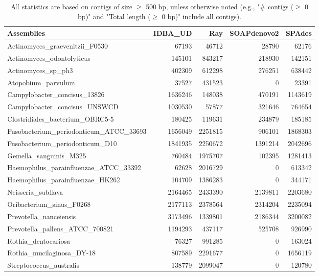 \documentclass[12pt,a4paper]{article}
\begin{document}
\begin{table}[ht]
\begin{center}
\caption{All statistics are based on contigs of size $\geq$ 500 bp, unless otherwise noted (e.g., "\# contigs ($\geq$ 0 bp)" and "Total length ($\geq$ 0 bp)" include all contigs).}
\begin{tabular}{|l*{4}{|r}|}
\hline
Assemblies & IDBA\_UD & Ray & SOAPdenovo2 & SPAdes \\ \hline
Actinomyces\_graevenitzii\_F0530 & 67193 & 46712 & 28790 & 62176 \\ \hline
Actinomyces\_odontolyticus & 145101 & 843217 & 218930 & 142151 \\ \hline
Actinomyces\_sp\_ph3 & 402309 & 612298 & 276251 & 638442 \\ \hline
Atopobium\_parvulum & 37527 & 431523 & 0 & 23391 \\ \hline
Campylobacter\_concisus\_13826 & 1636246 & 148038 & 470191 & 1143619 \\ \hline
Campylobacter\_concisus\_UNSWCD & 1030530 & 57877 & 321646 & 764654 \\ \hline
Clostridiales\_bacterium\_OBRC5-5 & 180425 & 119631 & 234879 & 185185 \\ \hline
Fusobacterium\_periodonticum\_ATCC\_33693 & 1656049 & 2251815 & 906101 & 1868303 \\ \hline
Fusobacterium\_periodonticum\_D10 & 1841935 & 2250672 & 1391214 & 2042696 \\ \hline
Gemella\_sanguinis\_M325 & 760484 & 1975707 & 102395 & 1281413 \\ \hline
Haemophilus\_parainfluenzae\_ATCC\_33392 & 62628 & 2016729 & 0 & 613342 \\ \hline
Haemophilus\_parainfluenzae\_HK262 & 104709 & 1386283 & 0 & 344171 \\ \hline
Neisseria\_subflava & 2164465 & 2433390 & 2139811 & 2203680 \\ \hline
Oribacterium\_sinus\_F0268 & 2177113 & 2378564 & 2314204 & 2235094 \\ \hline
Prevotella\_nanceiensis & 3173496 & 1339801 & 2186344 & 3200082 \\ \hline
Prevotella\_pallens\_ATCC\_700821 & 1194293 & 437117 & 525708 & 926990 \\ \hline
Rothia\_dentocariosa & 76327 & 991285 & 0 & 163024 \\ \hline
Rothia\_mucilaginosa\_DY-18 & 807589 & 2291677 & 0 & 1656119 \\ \hline
Streptococcus\_australis & 138779 & 2099047 & 0 & 120780 \\ \hline

\end{tabular}
\end{center}
\end{table}
\end{document}
